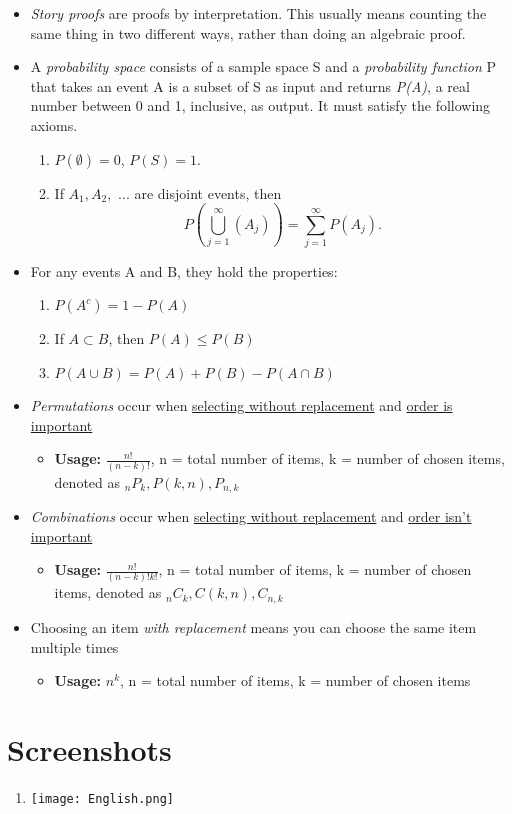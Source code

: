 \documentclass[12pt, letterpaper]{article}
\begin{document}
\begin{itemize}
    \item \textit{Story proofs} are proofs by interpretation. This usually means counting the same thing in two different ways, rather than doing an algebraic proof.
    \item A \textit{probability space} consists of a sample space S and a \textit{probability function} P that takes an event A is a subset of S as input and returns \textit{P(A)}, a real number between 0 and 1, inclusive, as output. It must satisfy the following axioms.
    \begin{enumerate}
        \item \(P(\emptyset) = 0\), \(P(S) = 1\).
        \item If \(A_{1}, A_{2},\) ... are disjoint events, then \[P(\bigcup\limits_{j=1}^{\infty}(A_{j})) = \sum\limits_{j=1}^{\infty}P(A_{j}).\]
    \end{enumerate}
    \item For any events A and B, they hold the properties:
    \begin{enumerate}
        \item \(P(A^{c}) = 1 - P(A) \)
        \item If \(A \subset B \), then \(P(A) \leq P(B) \)
        \item \(P(A \cup B) = P(A) + P(B) - P(A \cap B) \)
    \end{enumerate}
    \item \textit{Permutations} occur when \underline{selecting without replacement} and \underline{order is important}
    \begin{itemize}
        \item \textbf{Usage: }\(\frac{n!}{(n - k)!} \), n = total number of items, k = number of chosen items, denoted as \(_{n}P_{k}, P(k, n), P_{n, k}\)
    \end{itemize}
    \item \textit{Combinations} occur when \underline{selecting without replacement} and \underline{order isn't important}
    \begin{itemize}
        \item \textbf{Usage: }\(\frac{n!}{(n - k)!k!} \), n = total number of items, k = number of chosen items, denoted as \(_{n}C_{k}, C(k, n), C_{n, k}  \)
    \end{itemize}
    \item Choosing an item \textit{with replacement} means you can choose the same item multiple times
    \begin{itemize}
        \item \textbf{Usage: }\(n^{k}\), n = total number of items, k = number of chosen items
    \end{itemize}
\end{itemize}

\section{Screenshots}
\begin{enumerate}
    \item \texttt{[image: English.png]}
\end{enumerate}
\end{document}

